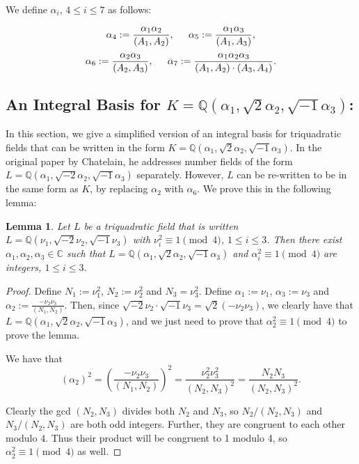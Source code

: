 \documentclass{amsart}
\newtheorem{lemma}{Lemma}
\begin{document}
We define $\alpha_i$, $4\leq i\leq 7$ as follows: 

\[\alpha_4 := \frac{\alpha_1\alpha_2}{(A_1,A_2)},\hspace{0.2in} \alpha_5 := \frac{\alpha_1\alpha_3}{(A_1,A_3)},\]
\[\alpha_6 := \frac{\alpha_2\alpha_3}{(A_2,A_3)},\hspace{0.2in}  \alpha_7 := \frac{\alpha_1\alpha_2\alpha_3}{(A_1,A_2)\cdot(A_3,A_4)}.\]


\subsection{An Integral Basis for $K = \mathbb{Q}\left(\alpha_1,\sqrt{2} \alpha_2,\sqrt{-1}\alpha_3\right)$:}

In this section, we give a simplified version of an integral basis for triquadratic fields that can be written in the form $K = \mathbb{Q}\left(\alpha_1,\sqrt{2} \alpha_2,\sqrt{-1}\alpha_3\right)$. In the original paper by Chatelain, he addresses number fields of the form $L = \mathbb{Q}\left(\alpha_1,\sqrt{-2} \alpha_2,\sqrt{-1}\alpha_3\right)$ separately. However, $L$ can be re-written to be in the same form as $K$, by replacing $\alpha_2$ with $\alpha_6$. We prove this in the following lemma:

 \begin{lemma} Let $L$ be a triquadratic field that is written $L = \mathbb{Q}\left(\nu_1,\sqrt{-2} \nu_2,\sqrt{-1}\nu_3\right)$ with $\nu_i^2\equiv1\pmod4$, $1\leq i\leq 3$. Then there exist $\alpha_1,\alpha_2,\alpha_3\in\mathbb{C}$ such that $L= \mathbb{Q}\left(\alpha_1,\sqrt{2} \alpha_2,\sqrt{-1}\alpha_3\right)$ and $\alpha_i^2\equiv1\pmod4$ are integers, $1\leq i\leq3$.
 \end{lemma}
 
 
 \begin{proof}
Define $N_1 := \nu_1^2$, $N_2 := \nu_2^2$ and $N_3 = \nu_3^2$. Define $\alpha_1:=\nu_1$, $\alpha_3:=\nu_3$ and $\alpha_2:=\frac{-\nu_2\nu_3}{(N_1,N_2)}$. Then, since $\sqrt{-2} \nu_2\cdot\sqrt{-1}\nu_3=\sqrt{2}(-\nu_2\nu_3)$, we clearly have that $L=\mathbb{Q}\left(\alpha_1,\sqrt{2} \alpha_2,\sqrt{-1}\alpha_3\right)$, and we just need to prove that $\alpha_2^2\equiv1\pmod4$ to prove the lemma. 

We have that
\[(\alpha_2)^2=\left(\frac{-\nu_2\nu_3}{(N_1,N_2)}\right)^2=\frac{\nu_2^2\nu_3^2}{(N_2,N_3)^2}=\frac{N_2N_3}{(N_2,N_3)^2}.\]

Clearly the gcd $(N_2,N_3)$ divides both $N_2$ and $N_3$, so $N_2/(N_2,N_3)$ and $N_3/(N_2,N_3)$ are both odd integers. Further, they are congruent to each other modulo 4. Thus their product will be congruent to 1 modulo 4, so $\alpha_2^2\equiv1\pmod4$ as well.
 \end{proof}
\end{document}
